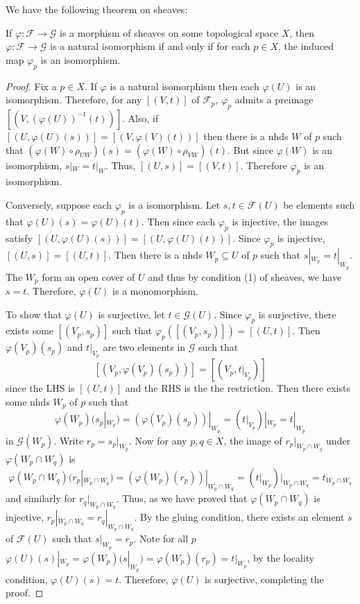 \documentclass[12pt,letter]{article}
\begin{document}
	We have the following theorem on sheaves:
	\begin{theorem}\label{t111}
	If $\varphi:\mathscr F\to\mathscr G$ is a morphism of sheaves on some topological space $X$, then $\varphi:\mathscr F\to\mathscr G$ is a natural isomorphism if and only if for each $p\in X$, the induced map $\varphi_p$ is an isomorphism.
	\end{theorem}
	\begin{proof}
	Fix a $p\in X$. If $\varphi$ is a natural isomorphism then each $\varphi(U)$ is an isomorphism. Therefore, for any $[(V, t)]$ of $\mathscr F_p$, $\varphi_p$ admits a preimage $[(V, (\varphi(U))^{-1}(t))]$. Also, if $[(U, \varphi(U)(s))]=[(V, \varphi(V)(t))]$ then there is a nhds $W$ of $p$ such that $(\varphi(W)\circ\rho_{UW})(s)=(\varphi(W)\circ\rho_{VW})(t)$. But since $\varphi(W)$ is an isomorphism, $s|_W=t|_W$. Thus, $[(U, s)]=[(V, t)]$. Therefore $\varphi_p$ is an isomorphism.
	
	Conversely, suppose each $\varphi_p$ is a isomorphism. Let $s, t\in \mathscr{F}(U)$ be elements such that $\varphi(U)(s)=\varphi(U)(t)$. Then since each $\varphi_p$ is injective, the images satisfy $[(U, \varphi(U)(s))]=[(U, \varphi(U)(t))]$. Since $\varphi_p$ is injective, $[(U, s)]=[(U, t)]$. Then there is a nhds $W_p\subseteq U$ of $p$ such that $s|_{W_p}=t|_{W_p}$. The $W_p$ form an open cover of $U$ and thus by condition (1) of sheaves, we have $s=t$. Therefore, $\varphi(U)$ is a monomorphism.
	
	To show that $\varphi(U)$ is surjective, let $t\in\mathscr G(U)$. Since $\varphi_p$ is surjective, there exists some $[(V_p, s_p)]$ such that $\varphi_p([(V_p, s_p)])=[(U, t)]$. Then $\varphi(V_p)(s_p)$ and $t|_{V_p}$ are two elements in $\mathscr G$ such that
	\[[(V_p, \varphi(V_p)(s_p))]=[(V_p, t|_{V_p})]\]
	since the LHS is $[(U, t)]$ and the RHS is the the restriction. Then there exists some nhds $W_p$ of $p$ such that 
	\[\varphi(W_p)(s_p|_{W_p})=\left(\varphi(V_p)(s_p)\right)|_{W_p}=\left(t|_{V_p}\right)|_{W_p}=t|_{W_p}\]
	in $\mathscr G(W_p)$. Write $r_p=s_p|_{W_p}$. Now for any $p, q\in X$, the image of $r_p|_{W_p\cap W_q}$ under $\varphi(W_p\cap W_q)$ is
	\[\varphi(W_p\cap W_q)(r_p|_{W_p\cap W_q})=\left(\varphi(W_p)(r_p)\right)|_{W_p\cap W_q}=\left(t|_{W_p}\right)|_{W_p\cap W_q}=t_{W_p\cap W_q}\]
	and similarly for $r_q|_{W_p\cap W_q}$. Thus, as we have proved that $\varphi(W_p\cap W_q)$ is injective, $r_p|_{W_p\cap W_q}=r_q|_{W_p\cap W_q}$. By the gluing condition, there exists an element $s$ of $\mathscr F(U)$ such that $s|_{W_p}=r_p$. Note for all $p$ $\varphi(U)(s)|_{W_p}=\varphi(W_p)(s|_{W_p})=\varphi(W_p)(r_p)=t|_{W_p}$, by the locality condition, $\varphi(U)(s)=t$. Therefore, $\varphi(U)$ is surjective, completing the proof.
	\end{proof}
\end{document}
